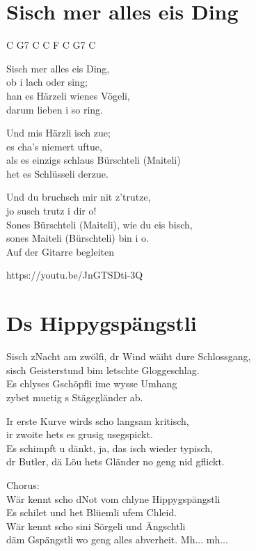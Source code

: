 \documentclass[
  letterpaper,
  twoside=false]{scrbook}
\begin{document}
\hypertarget{sisch-mer-alles-eis-ding}{%
\chapter{S\textquotesingle isch mer alles eis
Ding}\label{sisch-mer-alles-eis-ding}}

C G7 C C F C G7 C

S\textquotesingle isch mer alles eis Ding,\\
ob i lach oder sing;\\
han es Härzeli wienes Vögeli,\\
darum lieben i so ring.

Und mis Härzli isch zue;\\
es cha's niemert uftue,\\
als es einzigs schlaus Bürschteli (Maiteli)\\
het es Schlüsseli derzue.

Und du bruchsch mir nit z'trutze,\\
jo susch trutz i dir o!\\
Sones Bürschteli (Maiteli), wie du eis bisch,\\
sones Maiteli (Bürschteli) bin i o.\\
Auf der Gitarre begleiten

https://youtu.be/JnGTSDti-3Q

\hypertarget{ds-hippygspuxe4ngstli}{%
\chapter{Ds Hippygspängstli}\label{ds-hippygspuxe4ngstli}}

S\textquotesingle isch z\textquotesingle Nacht am zwölfi, dr Wind wäiht
dure Schlossgang,\\
s\textquotesingle isch Geisterstund bim letschte Gloggeschlag.\\
Es chlyses Gschöpfli ime wysse Umhang\\
zybet muetig s Stägegländer ab.

Ir erste Kurve wird\textquotesingle s scho langsam kritisch,\\
ir zwoite hets es grusig usegspickt.\\
Es schimpft u dänkt, ja, das isch wieder typisch,\\
dr Butler, dä Löu het\textquotesingle s Gländer no geng nid gflickt.

Chorus:\\
Wär kennt scho d\textquotesingle Not vom chlyne Hippygspängstli\\
Es schilet und het Blüemli ufem Chleid.\\
Wär kennt scho sini Sörgeli und Ängschtli\\
däm Gspängstli wo geng alles abverheit. Mh... mh...
\end{document}
